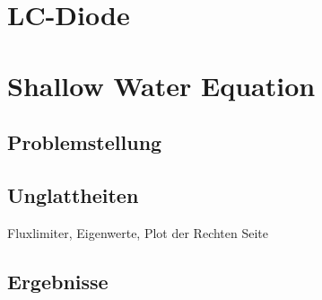 \section{LC-Diode}
\cite{boeck2014experiments}
\section{Shallow Water Equation}
\subsection{Problemstellung}
\subsection{Unglattheiten}
Fluxlimiter, Eigenwerte, Plot der Rechten Seite
\subsection{Ergebnisse}


